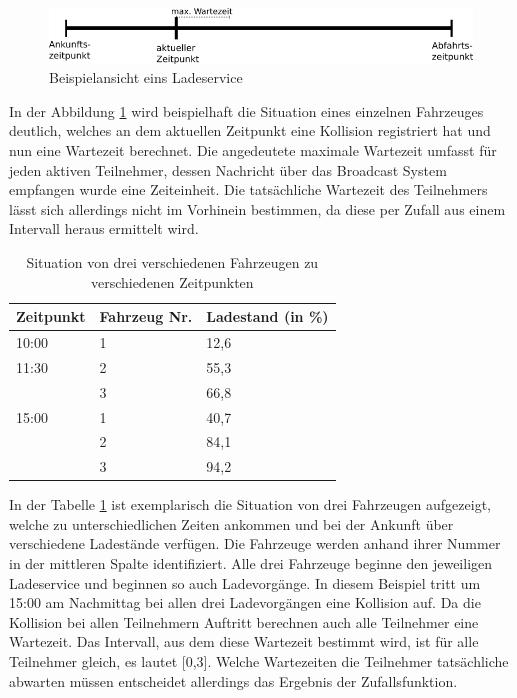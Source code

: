 \begin{figure}[htb]
	\includegraphics[width = \linewidth]{img/SA_participants_Graph2.png}
	\caption{Beispielansicht eins Ladeservice}
	\label{SAPart:Graph}
\end{figure}
In der Abbildung \ref{SAPart:Graph} wird beispielhaft die Situation eines einzelnen Fahrzeuges deutlich, welches an dem aktuellen Zeitpunkt eine Kollision registriert hat und nun eine Wartezeit berechnet. Die angedeutete maximale Wartezeit umfasst für jeden aktiven Teilnehmer, dessen Nachricht über das Broadcast System empfangen wurde eine Zeiteinheit. Die tatsächliche Wartezeit des Teilnehmers lässt sich allerdings nicht im Vorhinein bestimmen, da diese per Zufall aus einem Intervall heraus ermittelt wird.
\begin{table}[htb]
\centering
\begin{tabular}{|l|l|l|}
\hline
Zeitpunkt & Fahrzeug Nr. & Ladestand (in \%) \\ \hline \hline
10:00     & 1            & 12,6      \\ \hline
11:30     & 2            & 55,3      \\ \hline
          & 3            & 66,8      \\ \hline
15:00     & 1            & 40,7      \\ \hline
          & 2            & 84,1      \\ \hline
          & 3            & 94,2      \\ \hline
\end{tabular}
\caption{Situation von drei verschiedenen Fahrzeugen zu verschiedenen Zeitpunkten}
\label{tab:example1}
\end{table}


In der Tabelle \ref{tab:example1} ist exemplarisch die Situation von drei Fahrzeugen aufgezeigt, welche zu unterschiedlichen Zeiten ankommen und bei der Ankunft über verschiedene Ladestände verfügen. Die Fahrzeuge werden anhand ihrer Nummer in der mittleren Spalte identifiziert. Alle drei Fahrzeuge beginne den jeweiligen Ladeservice und beginnen so auch Ladevorgänge. In diesem Beispiel tritt um 15:00 am Nachmittag bei allen drei Ladevorgängen eine Kollision auf. Da die Kollision bei allen Teilnehmern Auftritt berechnen auch alle Teilnehmer eine Wartezeit. Das Intervall, aus dem diese Wartezeit bestimmt wird, ist für alle Teilnehmer gleich, es lautet [0,3]. Welche Wartezeiten die Teilnehmer tatsächliche abwarten müssen entscheidet allerdings das Ergebnis der Zufallsfunktion.


